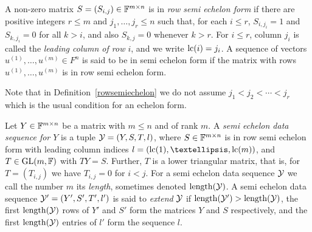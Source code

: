 \begin{Def}
    \label{rowsemiechelon}
%
{\rm
    A non-zero matrix $S = (S_{i,j}) \in \mathbb{F}^{m \times n}$ is in 
    \emph{row semi echelon form} if there are positive 
    integers $r \le m$ and $j_1,\ldots,j_r \le n$ such that,
    for each $i \le r$, $S_{i,j_i} = 1$ and $S_{k,j_i} = 0$ for all $k > i$, 
    and also $S_{k,j} = 0$ whenever $k > r$. For $i \le r$, column 
    $j_i$ is called the \emph{leading column of row $i$}, and we write
    $\mathrm{lc}(i) = j_i$. A sequence of vectors $u^{(1)},\ldots,u^{(m)} \in F^n$ is 
    said to be in semi echelon form if the matrix with rows 
    $u^{(1)},\ldots,u^{(m)}$ is in row semi echelon form.

}
\end{Def}

\noindent
Note that in Definition~\ref{rowsemiechelon} we do not assume 
$j_1 < j_2 < \cdots < j_r$ which is the usual condition for an echelon
form.

\begin{Def}
    \label{semiecheseq}
%
{\rm    Let $Y \in \mathbb{F}^{m \times n}$ be a matrix with $m \le n$ and of rank $m$. A 
    \emph{semi echelon data sequence for $Y$} is a tuple $\mathcal{Y}=
(Y,S,T,l)$, where
    $S \in \mathbb{F}^{m \times n}$ is in row semi echelon form with
    leading column indices $l = (\lc(1), \ldots, \lc(m))$, and
    $T \in \GL(m,\F)$ with $TY=S$. Further, $T$ is a lower triangular
    matrix, that is, for $T = (T_{i,j})$ we have
    $T_{i,j} = 0$ for $i < j$. For a semi echelon data sequence $\mathcal{Y}$
    we call the number $m$ its \emph{length}, sometimes denoted
    $\mathrm{length}(\mathcal{Y})$.
A semi echelon data sequence $\mathcal{Y}'=(Y',S',T',l')$ is said to 
\emph{extend} $\mathcal{Y}$
if $\mathrm{length}(\mathcal{Y}')>\mathrm{length}(\mathcal{Y})$, the first $\mathrm{length}(\mathcal{Y})$ rows of $Y'$ and $S'$ form
the matrices $Y$ and $S$ respectively, and the first $\mathrm{length}(\mathcal{Y})$ entries of $l'$
form the sequence $l$. 
}
\end{Def}

